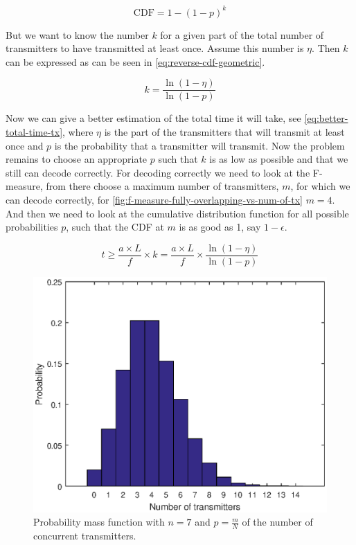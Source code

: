		\begin{equation}
			\label{eq:cdf-geometric}
			\text{CDF} = 1 - (1 - p)^k
		\end{equation}

		But we want to know the number $k$ for a given part of the total number of transmitters to have transmitted at least once.
		Assume this number is $\eta$. 
		Then $k$ can be expressed as can be seen in \autoref{eq:reverse-cdf-geometric}.

		\begin{equation}
			\label{eq:reverse-cdf-geometric}
			k = \frac{\ln(1 - \eta)}{\ln(1 - p)}
		\end{equation}

		Now we can give a better estimation of the total time it will take, see \autoref{eq:better-total-time-tx}, where $\eta$ is the part of the transmitters that will transmit at least once and $p$ is the probability that a transmitter will transmit.
		Now the problem remains to choose an appropriate $p$ such that $k$ is as low as possible and that we still can decode correctly.
		For decoding correctly we need to look at the F-measure, from there choose a maximum number of transmitters, $m$, for which we can decode correctly, for \autoref{fig:f-measure-fully-overlapping-vs-num-of-tx} $m = 4$.
		And then we need to look at the cumulative distribution function for all possible probabilities $p$, such that the CDF at $m$ is as good as 1, say $1 - \epsilon$.

		\begin{equation}
			\label{eq:better-total-time-tx}
			t \ge \frac{a \times L}{f} \times k = \frac{a \times L}{f} \times \frac{\ln(1 - \eta)}{\ln(1 - p)}
		\end{equation}



		\begin{figure}
			\centering
			\includegraphics[width=\textwidth]{chapters/pmf-n=7-p=m_over_N.eps}
			\caption{Probability mass function with $n = 7$ and $p = \frac{m}{N}$ of the number of concurrent transmitters.}
			\label{fig:pmf-n=7}
		\end{figure}

